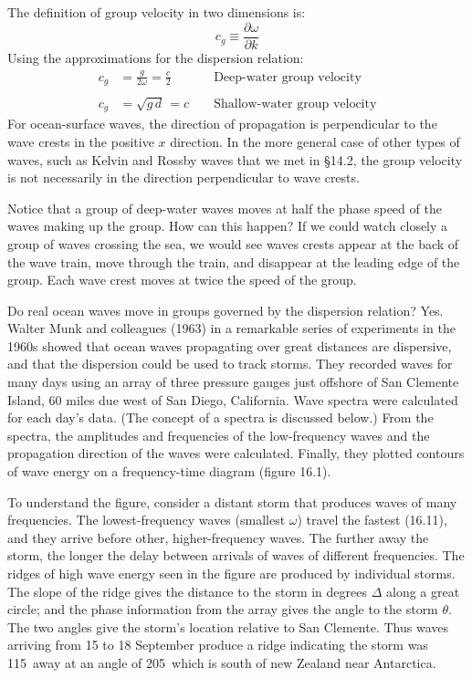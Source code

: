The definition of group velocity in two dimensions is:
\begin{equation}
c_{g} \equiv \frac {\partial \omega }{\partial k}
\end{equation}
Using the approximations for the dispersion relation:
 \begin{align}
 c_{g} &= \frac{g}{2\omega} = \frac{c}{2} & &   \text{ Deep-water group velocity} \\
  & & & \nonumber \\
 c_{g} &= \sqrt{g\,d} \, = c & &   \text{ Shallow-water group velocity}
 \end{align}
For ocean-surface waves, the direction of propagation is perpendicular
to the wave crests in the positive $x$ direction. In the more general
case of other types of waves, such as Kelvin and
Rossby waves that we met in \S14.2, the group
velocity is not necessarily in the direction perpendicular to wave
crests.

Notice that a group of deep-water waves moves at half the phase speed
of the waves making up the group. How can this happen? If we could
watch closely a group of waves crossing the sea, we would see waves
crests appear at the back of the wave train, move through the train,
and disappear at the leading edge of the group. Each wave crest moves
at twice the speed of the group.

Do real ocean waves move in groups governed by the dispersion
relation? Yes.  Walter Munk and colleagues (1963) in a remarkable
series of experiments in the 1960s showed that ocean waves propagating
over great distances are dispersive, and that the dispersion could be
used to track storms. They recorded waves for many days using an array
of three pressure gauges just offshore of San Clemente Island, 60
miles due west of San Diego, California. Wave spectra were calculated
for each day's data. (The concept of a spectra is discussed below.)
From the spectra, the amplitudes and frequencies of the low-frequency
waves and the propagation direction of the waves were
calculated. Finally, they plotted contours of wave energy on a
frequency-time diagram (figure 16.1).

To understand the figure, consider a distant storm that produces waves
of many frequencies. The lowest-frequency waves (smallest $\omega$)
travel the fastest (16.11), and they arrive before other,
higher-frequency waves. The further away the storm, the longer the
delay between arrivals of waves of different frequencies. The ridges
of high wave energy seen in the figure are produced by individual
storms. The slope of the ridge gives the distance to the storm in
degrees $\Delta$ along a great circle; and the phase information from
the array gives the angle to the storm $\theta$. The two angles give
the storm's location relative to San Clemente. Thus waves arriving
from 15 to 18 September produce a ridge indicating the storm was
115\degrees\ away at an angle of 205\degrees\ which is south of new
Zealand near Antarctica.

